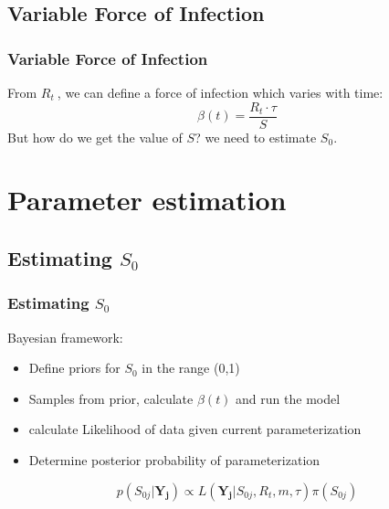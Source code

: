 \documentclass[10pt,compress,notheorems]{beamer}
\def \rr {$R_{t}\:$}
\begin{document}
\subsection{Variable Force of Infection}
\begin{frame}
\frametitle{Variable Force of Infection}
From \rr, we can define a force of infection which varies with time:
\begin{equation} 
 \label{eq:effbeta}
 \beta(t) = \frac{R_t\cdot\tau}{S}
\end{equation}
But how do we get the value of $S$? we need to estimate $S_0$.

\end{frame}


\section{Parameter estimation}
\subsection{Estimating $S_0$}
\begin{frame}
\frametitle{Estimating $S_0$}
Bayesian framework:
\begin{itemize}[<+->]
 \item Define priors for $S_0$ in the range (0,1)
 \item Samples from prior, calculate $\beta(t)$ and run the model
 \item calculate Likelihood of data given current parameterization
 \item Determine posterior probability of parameterization
\end{itemize}
\begin{equation}
 \label{eq:S0post}
 p(S_{0j}|\mathbf{Y_{j}}) \propto L(\mathbf{Y_{j}}|S_{0j}, R_t, m, \tau 
)\pi(S_{0j}) 
\end{equation}
\end{frame}
\end{document}
